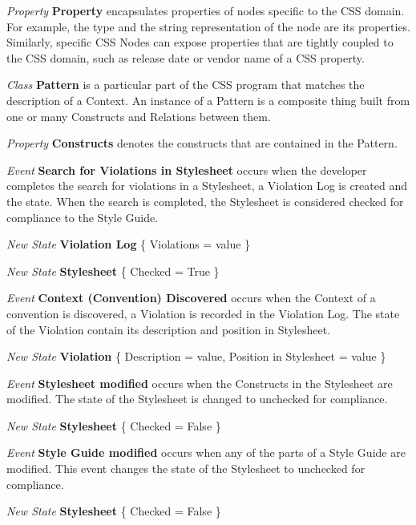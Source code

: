 \begin{description}
\textit{Property} \textbf{Property} encapsulates properties of nodes specific to the CSS domain. For example, the type and the string representation of the node are its properties. Similarly, specific CSS Nodes can expose properties that are tightly coupled to the CSS domain, such as release date or vendor name of a CSS property.


\item\textit{Class} \textbf{Pattern} is a particular part of the CSS program that matches the description of a Context. An instance of a Pattern is a composite thing built from one or many Constructs and Relations between them.

\textit{Property} \textbf{Constructs} denotes the constructs that are contained in the Pattern.


\item\textit{Event} \textbf{Search for Violations in Stylesheet} occurs when the developer completes the search for violations in a Stylesheet, a Violation Log is created and the state. When the search is completed, the Stylesheet is considered checked for compliance to the Style Guide.

\textit{New State} \textbf{Violation Log} \{ Violations = value \}

\textit{New State} \textbf{Stylesheet} \{ Checked = True \}


\item\textit{Event} \textbf{Context (Convention) Discovered} occurs when the Context of a convention is discovered, a Violation is recorded in the Violation Log. The state of the Violation contain its description and position in Stylesheet.

\textit{New State} \textbf{Violation} \{ Description = value, Position in Stylesheet = value \}


\item\textit{Event} \textbf{Stylesheet modified} occurs when the Constructs in the Stylesheet are modified. The state of the Stylesheet is changed to unchecked for compliance.

\textit{New State} \textbf{Stylesheet} \{ Checked = False \}


\item\textit{Event} \textbf{Style Guide modified} occurs when any of the parts of a Style Guide are modified. This event changes the state of the Stylesheet to unchecked for compliance.

\textit{New State} \textbf{Stylesheet} \{ Checked = False \}

\end{description}


